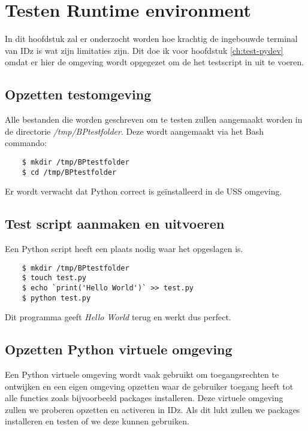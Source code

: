\chapter{Testen Runtime environment}
\label{ch:test-runtime}
In dit hoofdstuk zal er onderzocht worden hoe krachtig de ingebouwde terminal van IDz is wat zijn limitaties zijn. Dit doe ik voor hoofdstuk \ref{ch:test-pydev} omdat er hier de omgeving wordt opgegezet om de het testscript in uit te voeren. \\


\section{Opzetten testomgeving}
Alle bestanden die worden geschreven om te testen zullen aangemaakt worden in de directorie \textit{/tmp/BPtestfolder}. 
Deze wordt aangemaakt via het Bash commando: 

\begin{lstlisting}
    $ mkdir /tmp/BPtestfolder
    $ cd /tmp/BPtestfolder
\end{lstlisting}

Er wordt verwacht dat Python correct is geïnstalleerd in de USS omgeving.

\section{Test script aanmaken en uitvoeren}
Een Python script heeft een plaats nodig waar het opgeslagen is. 

\begin{lstlisting}
    $ mkdir /tmp/BPtestfolder
    $ touch test.py
    $ echo `print('Hello World')` >> test.py
    $ python test.py
\end{lstlisting}

Dit programma geeft \textit{Hello World} terug en werkt dus perfect.

\section{Opzetten Python virtuele omgeving}
Een Python virtuele omgeving wordt vaak gebruikt om toegangsrechten te ontwijken en een eigen omgeving opzetten waar de gebruiker toegang heeft tot alle functies zoals bijvoorbeeld packages installeren. Deze virtuele omgeving zullen we proberen opzetten en activeren in IDz. Als dit lukt zullen we packages installeren en testen of we deze kunnen gebruiken.


